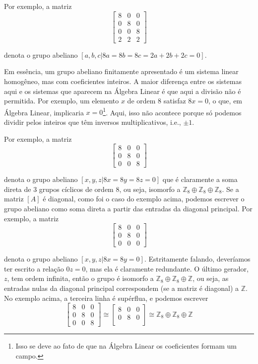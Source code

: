 \documentclass[a4paper,portuguese,11pt,twoside, leqno]{book}
\theoremstyle{definition}
\begin{document}
	\par\vspace{0.3cm} Por exemplo, a matriz 
	$$ \begin{bmatrix}
	8 & 0 & 0 \\
	0 & 8 & 0 \\
	0 & 0 & 8 \\
	2 & 2 & 2
	\end{bmatrix} $$
	\par\vspace{0.3cm} denota o grupo abeliano $[ a,b,c \vert 8a=8b=8c=2a+2b+2c=0 ]$.
	\par\vspace{0.3cm} Em essência, um grupo abeliano finitamente apresentado é um sistema linear homogêneo, mas com coeficientes inteiros. A maior diferença entre os sistemas aqui e os sistemas que aparecem na Álgebra Linear é que aqui a divisão não é permitida. Por exemplo, um elemento $x$ de ordem $8$ satisfaz $8x=0$, o que, em Álgebra Linear, implicaria $x=0$\footnote{Isso se deve ao fato de que na Álgebra Linear os coeficientes formam um campo.}. Aqui, isso não acontece porque só podemos dividir pelos inteiros que têm inversos multiplicativos, i.e., $\pm1$.
	\par\vspace{0.3cm} Por exemplo, a matriz 
	$$ \begin{bmatrix}
	8 & 0 & 0 \\
	0 & 8 & 0 \\
	0 & 0 & 8 
	\end{bmatrix} $$
	\par\vspace{0.3cm} denota o grupo abeliano $[x,y,z\vert 8x=8y=8z=0]$ que é claramente a soma direta de $3$ grupos cíclicos de ordem $8$, ou seja, isomorfo a $\mathbb{Z}_8\oplus\mathbb{Z}_8\oplus\mathbb{Z}_8$. Se a matriz $[A]$ é diagonal, como foi o caso do exemplo acima, podemos escrever o grupo abeliano como soma direta a partir das entradas da diagonal principal. Por exemplo, a matriz
	$$ \begin{bmatrix}
	8 & 0 & 0 \\
	0 & 8 & 0 \\
	0 & 0 & 0 
	\end{bmatrix} $$
	\par\vspace{0.3cm} denota o grupo abeliano $[x,y,z \vert 8x=8y=0]$. Estritamente falando, deveríamos ter escrito a relação $0z=0$, mas ela é claramente redundante. O último gerador, $z$, tem ordem infinita, então o grupo é isomorfo a $\mathbb{Z}_8\oplus\mathbb{Z}_8\oplus\mathbb{Z}$, ou seja, as entradas nulas da diagonal principal correspondem (se a matriz é diagonal) a $\mathbb{Z}$. No exemplo acima, a terceira linha é supérflua, e podemos escrever
	$$ \begin{bmatrix}
	8 & 0 & 0 \\
	0 & 8 & 0 \\
	0 & 0 & 8 
	\end{bmatrix}\cong \begin{bmatrix}
	8 & 0 & 0 \\
	0 & 8 & 0 \\ 
	\end{bmatrix} \cong \mathbb{Z}_8\oplus\mathbb{Z}_8\oplus\mathbb{Z} $$
\end{document}
